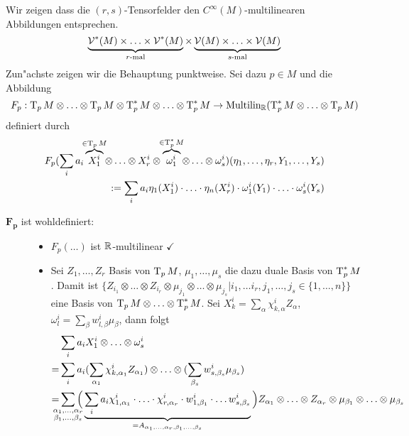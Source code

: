 \begin{Loes}
Wir zeigen dass die $(r,s)$-Tensorfelder den $C^\infty(M)$-multilinearen Abbildungen entsprechen.
	\[ \underbrace{\operatorname{\mathcal{V}}^*(M) \times \ldots \times \operatorname{\mathcal{V}}^*(M)}_{r\text{-mal}} \times \underbrace{\operatorname{\mathcal{V}}(M) \times \ldots \times \operatorname{\mathcal{V}}(M)}_{s\text{-mal}} \]
Zun"achste zeigen wir die Behauptung punktweise. Sei dazu $p \in M$ und die Abbildung
	\[ F_p: \operatorname{T}_pM \otimes \ldots \otimes \operatorname{T}_pM \otimes \operatorname{T}_p^*M \otimes \ldots \otimes \operatorname{T}_p^*M \to \text{Multilin}_{\operatorname{\mathbb{R}}}(\operatorname{T}_p^*M \otimes \ldots \otimes \operatorname{T}_pM) \]
definiert durch
\begin{align*}
	F_p(\sum_i a_i \overbrace{X_1^{i}}^{\mathclap{\in \T_pM}} \otimes \ldots \otimes X_r^{i} \otimes \overbrace{\omega_1^{i}}^{\mathclap{\in \T_p^*M}} \otimes \ldots \otimes \omega_s^{i})(\eta_1,\ldots ,\eta_r, Y_1, \ldots ,Y_s)\\
	\qquad := \sum_i a_i \eta_1(X_1^{i}) \cdot \ldots \cdot \eta_n(X_r^{i}) \cdot \omega_1^{i}(Y_1) \cdot \ldots \cdot \omega_s^{i}(Y_s)
\end{align*}
\begin{description}
\item[$\bm{F_p}$ ist wohldefiniert:]
	\begin{itemize}[leftmargin=*]
		\item
			$F_p(\ldots)$ ist $\operatorname{\mathbb{R}}$-multilinear $\checkmark$
		\item
			Sei $Z_1,\ldots ,Z_r$ Basis von $\operatorname{T}_pM$, $\mu_1,\ldots ,\mu_s$ die dazu duale Basis von $\operatorname{T}_p^*M$. Damit ist $\{Z_{i_1} \otimes \ldots \otimes Z_{i_r} \otimes \mu_{j_1} \otimes \ldots \otimes \mu_{j_s} | i_1, \ldots i_r, j_1, \ldots , j_s \in \{1,\ldots ,n\}\}$ eine Basis von $\operatorname{T}_pM \otimes \ldots \otimes \operatorname{T}_p^*M$. Sei $X_k^{i} = \sum_\alpha \chi_{k, \alpha}^{i} Z_\alpha$, $\omega_l^{i} = \sum_\beta w_{l, \beta}^{i} \mu_\beta$, dann folgt
			\begin{align*}
				& \sum_i a_i X_1^{i} \otimes \ldots \otimes \omega_s^{i}\\
				=& \sum_i a_i (\sum_{\alpha_1} \chi_{k, \alpha_1}^{i} Z_{\alpha_1}) \otimes \ldots  \otimes (\sum_{\beta_s} w_{s, \beta_s}^{i} \mu_{\beta_s})\\
				=& \sum_{\mathclap{\substack{\alpha_1,\ldots ,\alpha_r \\ \beta_1,\ldots ,\beta_s}}} \Big( \underbrace{\sum_i a_i \chi_{1,\alpha_1}^{i} \cdot \ldots \cdot \chi_{r,\alpha_r}^{i} \cdot w_{1, \beta_1}^{i} \cdot \ldots w_{s, \beta_s}^{i} }_{= A_{\alpha_1,\ldots , \alpha_r, \beta_1, \ldots ,\beta_s}} \Big) Z_{\alpha_1} \otimes \ldots \otimes Z_{\alpha_r} \otimes \mu_{\beta_1} \otimes \ldots \otimes \mu_{\beta_s}

\end{align*}
\end{itemize}
\end{description}
\end{Loes}
